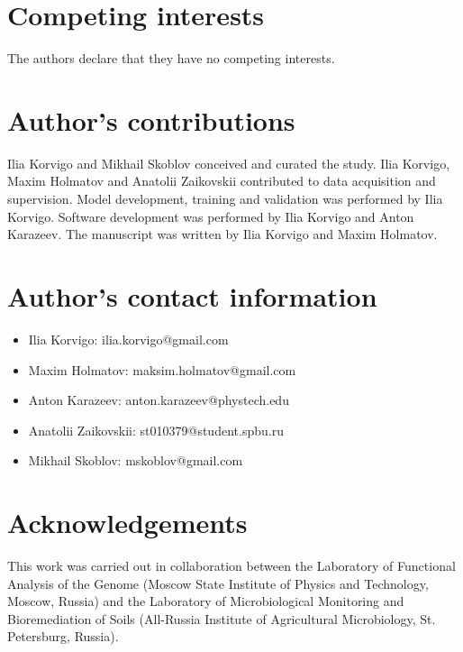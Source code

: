 \documentclass[twocolumn]{bmcart}%
\begin{document}
\begin{backmatter}

\section*{Competing interests}
The authors declare that they have no competing interests. 

\section*{Author's contributions}
Ilia Korvigo and Mikhail Skoblov conceived and curated the study. 
Ilia Korvigo, Maxim Holmatov and Anatolii Zaikovskii contributed to data acquisition and supervision.
Model development, training and validation was performed by Ilia Korvigo.
Software development was performed by Ilia Korvigo and Anton Karazeev.
The manuscript was written by Ilia Korvigo and Maxim Holmatov.

\section*{Author's contact information}

\begin{itemize}
	\item Ilia Korvigo: ilia.korvigo@gmail.com
	\item Maxim Holmatov: maksim.holmatov@gmail.com
	\item Anton Karazeev: anton.karazeev@phystech.edu
	\item Anatolii Zaikovskii: st010379@student.spbu.ru
	\item Mikhail Skoblov: mskoblov@gmail.com
\end{itemize}

\section*{Acknowledgements}
This work was carried out in collaboration between the Laboratory of Functional Analysis of the Genome (Moscow State Institute of Physics and Technology, Moscow, Russia) and the Laboratory of Microbiological Monitoring and Bioremediation of Soils (All-Russia Institute of Agricultural Microbiology, St. Petersburg, Russia).



\end{backmatter}
\end{document}
